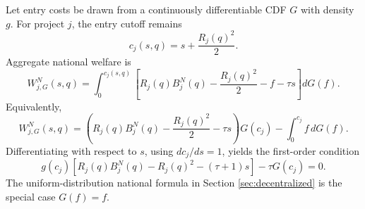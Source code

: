 Let entry costs be drawn from a continuously differentiable CDF \(G\) with density \(g\).
For project \(j\), the entry cutoff remains
\begin{equation}
    c_j(s,q)=s+\frac{R_j(q)^2}{2}.
\end{equation}
Aggregate national welfare is
\begin{equation}
    W_{j,G}^N(s,q)
    =
    \int_0^{c_j(s,q)}
    \left[
        R_j(q)B_j^N(q)
        -
        \frac{R_j(q)^2}{2}
        -
        f
        -
        \tau s
    \right] dG(f).
\end{equation}
Equivalently,
\begin{equation}
    W_{j,G}^N(s,q)
    =
    \left(
        R_j(q)B_j^N(q)
        -
        \frac{R_j(q)^2}{2}
        -
        \tau s
    \right)
    G(c_j)
    -
    \int_0^{c_j} f\,dG(f).
\end{equation}
Differentiating with respect to \(s\), using \(dc_j/ds=1\), yields the first-order condition
\begin{equation}
    g(c_j)
    \left[
        R_j(q)B_j^N(q)
        -
        R_j(q)^2
        -
        (\tau+1)s
    \right]
    -
    \tau G(c_j)
    =
    0.
\end{equation}
The uniform-distribution national formula in Section \ref{sec:decentralized} is the special case \(G(f)=f\).
